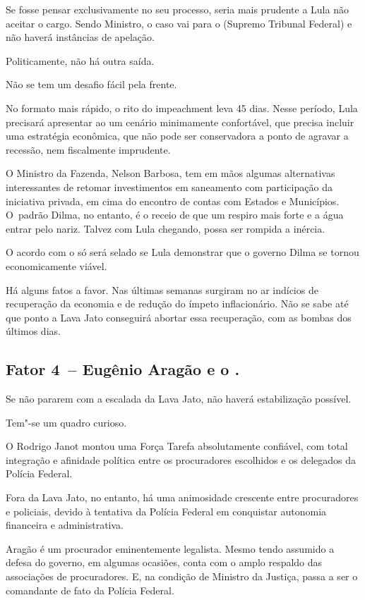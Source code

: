Se fosse pensar exclusivamente no seu processo, seria mais prudente a
Lula não aceitar o cargo. Sendo Ministro, o caso vai para o  (Supremo
Tribunal Federal) e não haverá instâncias de apelação.

Politicamente, não há outra saída.

Não se tem um desafio fácil pela frente.

No formato mais rápido, o rito do impeachment leva 45 dias. Nesse
período, Lula precisará apresentar ao  um cenário minimamente
confortável, que precisa incluir uma estratégia econômica, que não pode
ser conservadora a ponto de agravar a recessão, nem fiscalmente
imprudente.

O Ministro da Fazenda, Nelson Barbosa, tem em mãos algumas alternativas
interessantes de retomar investimentos em saneamento com participação da
iniciativa privada, em cima do encontro de contas com Estados e
Municípios. O~padrão Dilma, no entanto, é o receio de que um respiro
mais forte e a água entrar pelo nariz. Talvez com Lula chegando, possa
ser rompida a inércia.

O acordo com o  só será selado se Lula demonstrar que o governo
Dilma se tornou economicamente viável.

Há alguns fatos a favor. Nas últimas semanas surgiram no ar indícios de
recuperação da economia e de redução do ímpeto inflacionário. Não se
sabe até que ponto a Lava Jato conseguirá abortar essa recuperação, com
as bombas dos últimos dias.

\subsection{\textbf{Fator 4}~-- Eugênio Aragão e o .}

Se não pararem com a escalada da Lava Jato, não haverá estabilização
possível.

Tem"-se um quadro curioso.

O  Rodrigo Janot montou uma Força Tarefa absolutamente confiável, com
total integração e afinidade política entre os procuradores escolhidos e
os delegados da Polícia Federal.

Fora da Lava Jato, no entanto, há uma animosidade crescente entre
procuradores e policiais, devido à tentativa da Polícia Federal em
conquistar autonomia financeira e administrativa.

Aragão é um procurador eminentemente legalista. Mesmo tendo assumido a
defesa do governo, em algumas ocasiões, conta com o amplo respaldo das
associações de procuradores. E, na condição de Ministro da Justiça,
passa a ser o comandante de fato da Polícia Federal.

